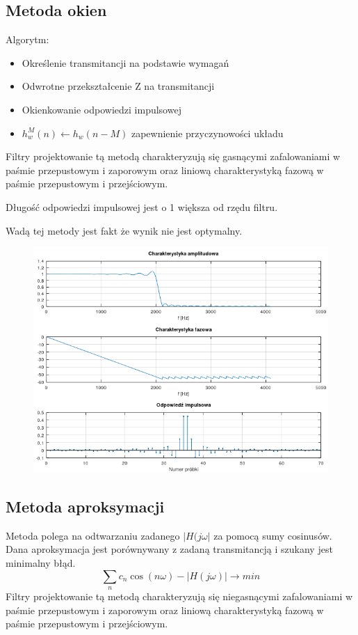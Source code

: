\documentclass[11pt]{article}
\begin{document}
\subsection{Metoda okien}
Algorytm:
\begin{itemize}
	\item Określenie transmitancji na podstawie wymagań
	\item Odwrotne przekształcenie Z na transmitancji
	\item Okienkowanie odpowiedzi impulsowej
	\item $ h_w^M(n) \leftarrow h_w(n-M) $ zapewnienie przyczynowości układu
\end{itemize}
Filtry projektowanie tą metodą charakteryzują się gasnącymi zafalowaniami w paśmie przepustowym i zaporowym oraz liniową charakterystyką fazową w paśmie przepustowym i przejściowym.

Długość odpowiedzi impulsowej jest o 1 większa od rzędu filtru.

Wadą tej metody jest fakt że wynik nie jest optymalny.
\begin{figure}[h]
    \centering
    \includegraphics[width=15cm]{fir_ok.png}
\end{figure}

\subsection{Metoda aproksymacji}
Metoda polega na odtwarzaniu zadanego $|H(j\omega|$ za pomocą sumy cosinusów. Dana aproksymacja jest porównywany z zadaną transmitancją i szukany jest minimalny błąd.
\[ \sum_{n} c_n \cos{(n\omega)} - |H(j\omega)| \rightarrow min  \]
Filtry projektowanie tą metodą charakteryzują się niegasnącymi zafalowaniami w paśmie przepustowym i zaporowym oraz liniową charakterystyką fazową w paśmie przepustowym i przejściowym.
\end{document}

